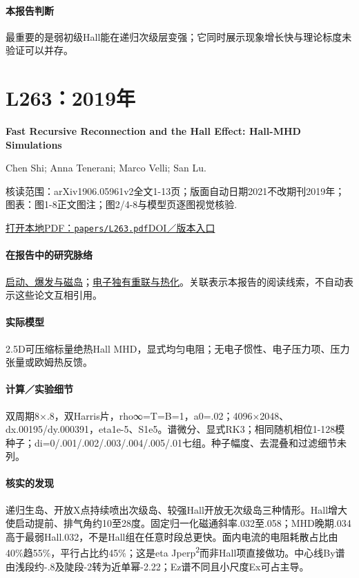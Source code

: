 \paragraph{本报告判断}最重要的是弱初级Hall能在递归次级层变强；它同时展示现象增长快与理论标度未验证可以并存。

\section{L263：2019年}\label{paper:L263}

\textbf{Fast Recursive Reconnection and the Hall Effect: Hall-MHD Simulations}\citep{L263}\

Chen Shi;  Anna Tenerani;  Marco Velli;  San Lu.

\textsf{核读范围：}arXiv1906.05961v2全文1-13页；版面自动日期2021不改期刊2019年；\textsf{图表：}图1-8正文图注；图2/4-8与模型页逐图视觉核验.

\href{run:papers/L263.pdf}{打开本地PDF：\texttt{papers/L263.pdf}}\quad\href{https://doi.org/10.3847/1538-4357/ab33ff}{DOI／版本入口}

\paragraph{在报告中的研究脉络}\hyperref[story:onset]{启动、爆发与磁岛}；\hyperref[story:energy]{电子独有重联与热化}。关联表示本报告的阅读线索，不自动表示这些论文互相引用。

\paragraph{实际模型}2.5D可压缩标量绝热Hall MHD，显式均匀电阻；无电子惯性、电子压力项、压力张量或欧姆热反馈。

\paragraph{计算／实验细节}双周期8×.8，双Harris片，rho∞=T=B=1，a0=.02；4096×2048、dx.00195/dy.000391，eta1e-5、S1e5。谱微分、显式RK3；相同随机相位1-128模种子；di=0/.001/.002/.003/.004/.005/.01七组。种子幅度、去混叠和过滤细节未列。

\paragraph{核实的发现}递归生岛、开放X点持续喷出次级岛、较强Hall开放无次级岛三种情形。Hall增大使启动提前、排气角约10至28度。固定归一化磁通斜率.032至.058；MHD晚期.034高于最弱Hall.032，不是Hall组在任意时段总更快。面内电流的电阻耗散占比由40\%趋55\%，平行占比约45\%；这是eta Jperp\textsuperscript{2}而非Hall项直接做功。中心线By谱由浅段约-.8及陡段-2转为近单幂-2.22；Ez谱不同且小尺度Ex可占主导。

